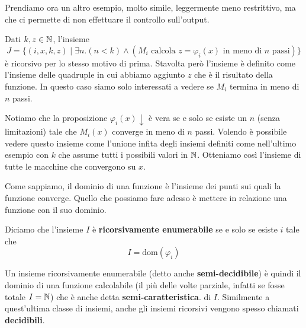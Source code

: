 Prendiamo ora un altro esempio, molto simile, leggermente meno
restrittivo, ma che ci permette di non effettuare il controllo
sull'output.

\begin{example}
	Dati $k, z \in \mathbb{N}$, l'insieme
	\[
		J = \{ (i,x,k,z) \mid \exists n . (n < k)
		\land (M_i \text{ calcola } z = \varphi_i (x)
		\text{ in meno di } n \text{ passi}) \}
	\]
	è ricorsivo per lo stesso motivo di prima. Stavolta però
	l'insieme è definito come l'insieme delle quadruple in cui
	abbiamo aggiunto $z$ che è il risultato della funzione. In
	questo caso siamo solo interessati a vedere se $M_i$ termina
	in meno di $n$ passi.
\end{example}

Notiamo che la proposizione $\varphi_i (x) \downarrow$ è vera se
e solo se esiste un $n$ (senza limitazioni) tale che
$M_i(x)$ converge in meno di $n$ passi. Volendo è possibile
vedere questo insieme come l'unione infita degli insiemi
definiti come nell'ultimo esempio con $k$ che assume tutti i
possibili valori in $\mathbb{N}$. Otteniamo così l'insieme di tutte le
macchine che convergono su $x$.

Come sappiamo, il dominio di una funzione è l'insieme dei punti
sui quali la funzione converge. Quello che possiamo fare adesso
è mettere in relazione una funzione con il suo dominio.

\begin{definition} \label{def: rec_enum}
	Diciamo che l'insieme $I$ è \textbf{ricorsivamente enumerabile}
	se e solo se esiste $i$ tale che
	\[ I = \text{dom}(\varphi_i) \]
\end{definition}

Un insieme ricorsivamente enumerabile (detto anche
\textbf{semi-decidibile}) è quindi il dominio di una funzione
calcolabile (il più delle volte parziale, infatti se fosse
totale $I = \mathbb{N}$) che è anche detta \textbf{semi-caratteristica}.
di $I$. Similmente a quest'ultima classe di insiemi, anche gli
insiemi ricorsivi vengono spesso chiamati \textbf{decidibili}.


